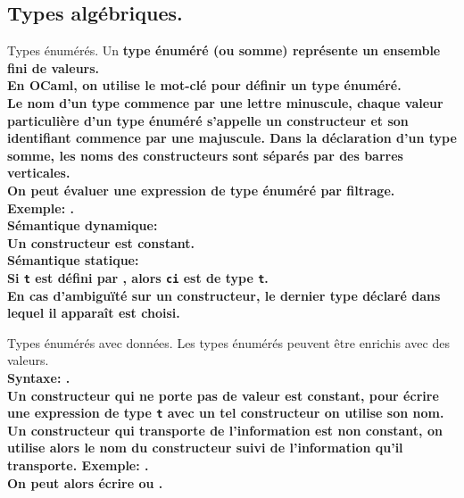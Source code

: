\documentclass[french, 11pt]{article}
\begin{document}
\subsection{Types algébriques.}

\begin{defi}{Types énumérés.}{}
    Un \bf{type énuméré} (ou somme) représente un ensemble fini de valeurs.\\
    En OCaml, on utilise le mot-clé  pour définir un type énuméré.\\
    Le nom d'un type commence par une lettre minuscule, chaque valeur particulière d'un type énuméré s'appelle un constructeur et son identifiant commence par une majuscule. Dans la déclaration d'un type somme, les noms des constructeurs sont séparés par des barres verticales.\\
    On peut évaluer une expression de type énuméré par filtrage.\\
    \bf{Exemple:} .\\
    \bf{Sémantique dynamique:}\\
    Un constructeur est constant.\\
    \bf{Sémantique statique:}\\
    Si \texttt{t} est défini par , alors \texttt{ci} est de type \texttt{t}.\\
    En cas d'ambiguïté sur un constructeur, le dernier type déclaré dans lequel il apparaît est choisi. 
\end{defi}

\begin{defi}{Types énumérés avec données.}{}
    Les types énumérés peuvent être enrichis avec des valeurs.\\
    \bf{Syntaxe:} .\\
    Un constructeur qui ne porte pas de valeur est constant, pour écrire une expression de type \texttt{t} avec un tel constructeur on utilise son nom.\\
    Un constructeur qui transporte de l'information est non constant, on utilise alors le nom du constructeur suivi de l'information qu'il transporte.\n
    \bf{Exemple:} .\\
    On peut alors écrire  ou .
\end{defi}
\end{document}
